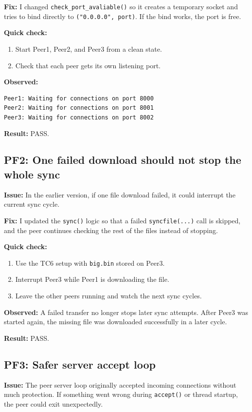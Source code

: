 \documentclass[11pt]{article}
\begin{document}
\textbf{Fix:} I changed \texttt{check\_port\_avaliable()} so it creates a temporary socket and tries to bind directly to \texttt{("0.0.0.0", port)}. If the bind works, the port is free.

\textbf{Quick check:}
\begin{enumerate}[noitemsep]
  \item Start Peer1, Peer2, and Peer3 from a clean state.
  \item Check that each peer gets its own listening port.
\end{enumerate}

\textbf{Observed:}
\begin{lstlisting}
Peer1: Waiting for connections on port 8000
Peer2: Waiting for connections on port 8001
Peer3: Waiting for connections on port 8002
\end{lstlisting}

\textbf{Result:} PASS.

\subsection{PF2: One failed download should not stop the whole sync}
\textbf{Issue:} In the earlier version, if one file download failed, it could interrupt the current sync cycle.

\textbf{Fix:} I updated the \texttt{sync()} logic so that a failed \texttt{syncfile(...)} call is skipped, and the peer continues checking the rest of the files instead of stopping.

\textbf{Quick check:}
\begin{enumerate}[noitemsep]
  \item Use the TC6 setup with \texttt{big.bin} stored on Peer3.
  \item Interrupt Peer3 while Peer1 is downloading the file.
  \item Leave the other peers running and watch the next sync cycles.
\end{enumerate}

\textbf{Observed:} A failed transfer no longer stops later sync attempts. After Peer3 was started again, the missing file was downloaded successfully in a later cycle.

\textbf{Result:} PASS.

\subsection{PF3: Safer server accept loop}
\textbf{Issue:} The peer server loop originally accepted incoming connections without much protection. If something went wrong during \texttt{accept()} or thread startup, the peer could exit unexpectedly.
\end{document}
